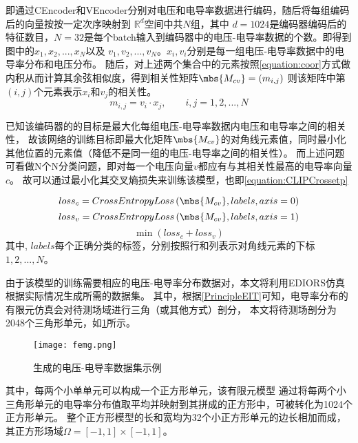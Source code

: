 即通过CEncoder和VEncoder分别对电压和电导率数据进行编码，随后将每组编码后的向量按按一定次序映射到 $\mathbb{R}^d$空间中共$N$组，其中
$d=1024$是编码器编码后的特征数目，$N=32$是每个batch输入到编码器中的电压-电导率数据的个数。即得到图中的$x_1, x_2,...,x_N$以及
$v_1, v_2,..., v_N$。$x_i,v_i$分别是每一组电压-电导率数据中的电导率分布和电压分布。
随后，对上述两个集合中的元素按照\cref{equation:coor}方式做内积从而计算其余弦相似度，得到相关性矩阵$\mbs{M_{cv}}= \left(m_{i,j}\right)$
则该矩阵中第$(i,j)$个元素表示$x_i$和$v_j$的相关性。
\begin{equation}
    \label{equation:coor}
    m_{i,j} = v_{i} \cdot x_{j}, \qquad i,j=1,2,...,N
\end{equation}


已知该编码器的的目标是最大化每组电压-电导率数据内电压和电导率之间的相关性，
故该网络的训练目标即最大化矩阵$\mbs{M_{cv}}$的对角线元素值，同时最小化其他位置的元素值（降低不是同一组的电压-电导率之间的相关性）。
而上述问题可看做N个N分类问题，即对每一个电压向量$v$都应有与其相关性最高的电导率向量$c$。
故可以通过最小化其交叉熵损失来训练该模型，也即\cref{equation:CLIPCrossetp}

\begin{equation}
    loss_c = CrossEntropyLoss \left(\mbs{M_{cv}}, labels, axis=0\right)
\end{equation}
\begin{equation}
    loss_v = CrossEntropyLoss \left(\mbs{M_{cv}}, labels, axis=1\right)
\end{equation}
\begin{equation}
    \label{equation:CLIPCrossetp}
    \min \left(loss_c + loss_v\right)
\end{equation}
其中, $labels$每个正确分类的标签，分别按照行和列表示对角线元素的下标$1,2,...,N$。

由于该模型的训练需要相应的电压-电导率分布数据对，本文将利用EDIORS仿真根据实际情况生成所需的数据集。
其中，根据\cref{PrincipleEIT}可知，电导率分布的有限元仿真会对待测场域进行三角（或其他方式）剖分，
本文将待测场剖分为2048个三角形单元，如\cref{figure:femg}所示。

\begin{figure}[h]
    \centering
    \texttt{[image: femg.png]}
    \caption{生成的电压-电导率数据集示例}
    \label{figure:femg}
\end{figure}

其中，每两个小单单元可以构成一个正方形单元，该有限元模型
通过将每两个小三角形单元的电导率分布值取平均并映射到其拼成的正方形中，可被转化为1024个正方形单元。
整个正方形模型的长和宽均为32个小正方形单元的边长相加而成，其正方形场域$\Omega = \left[-1, 1\right] \times \left[-1, 1\right]$。


